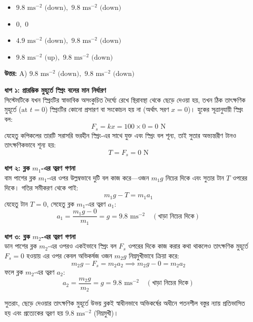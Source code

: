 \documentclass[12pt, a4paper]{article}
\begin{document}
\begin{itemize}[label={}, leftmargin=1cm, itemsep=0.5em]
\item[\textbf{A)}] $9.8\text{ ms}^{-2} \text{ (down)}, \,\, 9.8\text{ ms}^{-2} \text{ (down)}$
\item[\textbf{B)}] $0, \,\, 0$
\item[\textbf{C)}] $4.9\text{ ms}^{-2} \text{ (down)}, \,\, 9.8\text{ ms}^{-2} \text{ (down)}$
\item[\textbf{D)}] $9.8\text{ ms}^{-2} \text{ (up)}, \,\, 9.8\text{ ms}^{-2} \text{ (down)}$
\end{itemize}

\vspace{0.5em}
\begin{tcolorbox}[answerbox]
\textbf{\color{success} উত্তর:} A) $9.8\text{ ms}^{-2} \text{ (down)}, \,\, 9.8\text{ ms}^{-2} \text{ (down)}$
\end{tcolorbox}
\vspace{1em}

\begin{tcolorbox}[solutionbox={সমাধান (Solution)}]
\noindent
\textbf{ধাপ ১: প্রারম্ভিক মুহূর্তে স্প্রিং বলের মান নির্ধারণ} \\
সিস্টেমটিকে যখন স্প্রিংটির স্বাভাবিক অসংকুচিত দৈর্ঘ্যে রেখে স্থিরাবস্থা থেকে ছেড়ে দেওয়া হয়, তখন ঠিক তাৎক্ষণিক মুহূর্তে ($\text{at } t = 0$) স্প্রিংটির কোনো প্রসারণ বা সংকোচন হয় না (অর্থাৎ সরণ $x = 0$)। হুকের সূত্রানুযায়ী স্প্রিং বল:
\[ F_s = k x = 100 \times 0 = 0\text{ N} \]
যেহেতু কপিকলের তারটি সরাসরি ভরহীন স্প্রিং-এর সাথে যুক্ত এবং স্প্রিং বল শূন্য, তাই সুতার অভ্যন্তরীণ টানও তাৎক্ষণিকভাবে শূন্য হয়:
\[ T = F_s = 0\text{ N} \]

\vspace{0.5em}
\noindent
\textbf{ধাপ ২: ব্লক $m_1$-এর ত্বরণ গণনা} \\
বাম পাশের ব্লক $m_1$-এর ওপর উল্লম্বভাবে দুটি বল কাজ করে—ওজন $m_1 g$ নিচের দিকে এবং সুতার টান $T$ ওপরের দিকে। গতির সমীকরণ থেকে পাই:
\[ m_1 g - T = m_1 a_1 \]
যেহেতু টান $T = 0$, সেহেতু ব্লক $m_1$-এর ত্বরণ $a_1$:
\[ a_1 = \frac{m_1 g - 0}{m_1} = g = 9.8\text{ ms}^{-2} \quad (\text{খাড়া নিচের দিকে}) \]

\vspace{0.5em}
\noindent
\textbf{ধাপ ৩: ব্লক $m_2$-এর ত্বরণ গণনা} \\
ডান পাশের ব্লক $m_2$-এর ওপরও একইভাবে স্প্রিং বল $F_s$ ওপরের দিকে কাজ করার কথা থাকলেও তাৎক্ষণিক মুহূর্তে $F_s = 0$ হওয়ায় এর ওপর কেবল অভিকর্ষজ ওজন $m_2 g$ নিম্নমুখীভাবে ক্রিয়া করে:
\[ m_2 g - F_s = m_2 a_2 \implies m_2 g - 0 = m_2 a_2 \]
ফলে ব্লক $m_2$-এর ত্বরণ $a_2$:
\[ a_2 = \frac{m_2 g}{m_2} = g = 9.8\text{ ms}^{-2} \quad (\text{খাড়া নিচের দিকে}) \]

সুতরাং, ছেড়ে দেওয়ার তাৎক্ষণিক মুহূর্তে উভয় ব্লকই স্বাধীনভাবে অভিকর্ষের অধীনে পতনশীল বস্তুর ন্যায় প্রতিভাসিত হয় এবং প্রত্যেকের ত্বরণ হয় $9.8\text{ ms}^{-2}$ (নিম্নমুখী)।
\end{tcolorbox}
\end{document}
